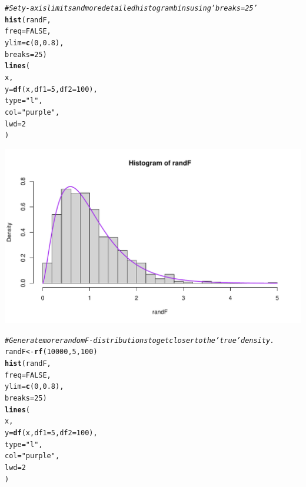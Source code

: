 \documentclass[oneside]{book}\usepackage[]{graphicx}\usepackage[dvipsnames,table,xcdraw]{xcolor}
\makeatletter
\def\maxwidth{ %
  \ifdim\Gin@nat@width>\linewidth
    \linewidth
  \else
    \Gin@nat@width
  \fi
}
\newcommand{\hlnum}[1]{\textcolor[rgb]{0.686,0.059,0.569}{#1}}%
\newcommand{\hlstr}[1]{\textcolor[rgb]{0.192,0.494,0.8}{#1}}%
\newcommand{\hlcom}[1]{\textcolor[rgb]{0.678,0.584,0.686}{\textit{#1}}}%
\newcommand{\hlstd}[1]{\textcolor[rgb]{0.345,0.345,0.345}{#1}}%
\newcommand{\hlkwb}[1]{\textcolor[rgb]{0.69,0.353,0.396}{#1}}%
\newcommand{\hlkwc}[1]{\textcolor[rgb]{0.333,0.667,0.333}{#1}}%
\newcommand{\hlkwd}[1]{\textcolor[rgb]{0.737,0.353,0.396}{\textbf{#1}}}%
\newenvironment{kframe}{%
 \def\at@end@of@kframe{}%
 \ifinner\ifhmode%
  \def\at@end@of@kframe{\end{minipage}}%
  \begin{minipage}{\columnwidth}%
 \fi\fi%
 \def\FrameCommand##1{\hskip\@totalleftmargin \hskip-\fboxsep
 \colorbox{shadecolor}{##1}\hskip-\fboxsep
     \hskip-\linewidth \hskip-\@totalleftmargin \hskip\columnwidth}%
 \MakeFramed {\advance\hsize-\width
   \@totalleftmargin\z@ \linewidth\hsize
   \@setminipage}}%
 {\par\unskip\endMakeFramed%
 \at@end@of@kframe}
\newenvironment{knitrout}{}{} %
\makeatother
\begin{document}
\begin{knitrout}
{}


\begin{kframe}\begin{alltt}
\hlcom{# Set y-axis limits and more detailed histogram bins using 'breaks = 25'}
\hlkwd{hist}\hlstd{(randF,}
\hlkwc{freq} \hlstd{=} \hlnum{FALSE}\hlstd{,}
\hlkwc{ylim} \hlstd{=} \hlkwd{c}\hlstd{(}\hlnum{0}\hlstd{,} \hlnum{0.8}\hlstd{),}
\hlkwc{breaks} \hlstd{=} \hlnum{25}\hlstd{)}
\hlkwd{lines}\hlstd{(}
\hlstd{x,}
\hlkwc{y} \hlstd{=} \hlkwd{df}\hlstd{(x,} \hlkwc{df1} \hlstd{=} \hlnum{5}\hlstd{,} \hlkwc{df2} \hlstd{=} \hlnum{100}\hlstd{),}
\hlkwc{type} \hlstd{=} \hlstr{"l"}\hlstd{,}
\hlkwc{col} \hlstd{=} \hlstr{"purple"}\hlstd{,}
\hlkwc{lwd} \hlstd{=} \hlnum{2}
\hlstd{)}
\end{alltt}
\end{kframe}

{\centering \includegraphics[width=\maxwidth]{figure/unnamed-chunk-35-3} 

}


\begin{kframe}\begin{alltt}
\hlcom{# Generate more random F-distributions to get closer to the 'true' density.}
\hlstd{randF} \hlkwb{<-} \hlkwd{rf}\hlstd{(}\hlnum{10000}\hlstd{,} \hlnum{5}\hlstd{,} \hlnum{100}\hlstd{)}
\hlkwd{hist}\hlstd{(randF,}
\hlkwc{freq} \hlstd{=} \hlnum{FALSE}\hlstd{,}
\hlkwc{ylim} \hlstd{=} \hlkwd{c}\hlstd{(}\hlnum{0}\hlstd{,} \hlnum{0.8}\hlstd{),}
\hlkwc{breaks} \hlstd{=} \hlnum{25}\hlstd{)}
\hlkwd{lines}\hlstd{(}
\hlstd{x,}
\hlkwc{y} \hlstd{=} \hlkwd{df}\hlstd{(x,} \hlkwc{df1} \hlstd{=} \hlnum{5}\hlstd{,} \hlkwc{df2} \hlstd{=} \hlnum{100}\hlstd{),}
\hlkwc{type} \hlstd{=} \hlstr{"l"}\hlstd{,}
\hlkwc{col} \hlstd{=} \hlstr{"purple"}\hlstd{,}
\hlkwc{lwd} \hlstd{=} \hlnum{2}
\hlstd{)}
\end{alltt}
\end{kframe}


\end{knitrout}
\end{document}
